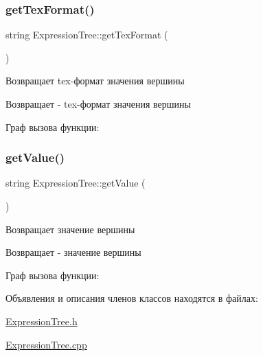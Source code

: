 \subsubsection{\texorpdfstring{get\+Tex\+Format()}{getTexFormat()}}
{\footnotesize\ttfamily string Expression\+Tree\+::get\+Tex\+Format (\begin{DoxyParamCaption}{ }\end{DoxyParamCaption})}



Возвращает tex-\/формат значения вершины 

\begin{DoxyReturn}{Возвращает}
-\/ tex-\/формат значения вершины 
\end{DoxyReturn}
Граф вызова функции\+:
\mbox{\label{class_expression_tree_ab8b29bfa5c593849c39becf1b501c80f}} 
\subsubsection{\texorpdfstring{get\+Value()}{getValue()}}
{\footnotesize\ttfamily string Expression\+Tree\+::get\+Value (\begin{DoxyParamCaption}{ }\end{DoxyParamCaption})}



Возвращает значение вершины 

\begin{DoxyReturn}{Возвращает}
-\/ значение вершины 
\end{DoxyReturn}
Граф вызова функции\+:


Объявления и описания членов классов находятся в файлах\+:\begin{DoxyCompactItemize}
\item 
\mbox{\hyperlink{_expression_tree_8h}{Expression\+Tree.\+h}}\item 
\mbox{\hyperlink{_expression_tree_8cpp}{Expression\+Tree.\+cpp}}\end{DoxyCompactItemize}
